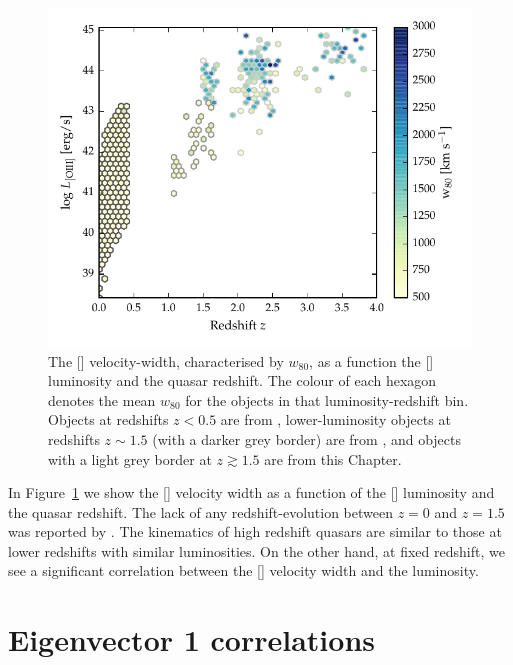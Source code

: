 \begin{figure}[t!]
    \includegraphics[width=\columnwidth]{figures/chapter04/oiii_luminosity_z_w80.pdf} 
    \caption[{The [] velocity-width, characterised by $w_{80}$, as a function the [] luminosity and the quasar redshift.}]{The [] velocity-width, characterised by $w_{80}$, as a function the [] luminosity and the quasar redshift. The colour of each hexagon denotes the mean $w_{80}$ for the objects in that luminosity-redshift bin. Objects at redshifts $z<0.5$ are from \citet{mullaney13}, lower-luminosity objects at redshifts $z\sim1.5$ (with a darker grey border) are from \citet{harrison16}, and objects with a light grey border at $z \gtrsim 1.5$ are from this Chapter.}       
    \label{fig:oiii_luminosity_z_w80}
\end{figure}

In Figure~\ref{fig:oiii_luminosity_z_w80} we show the [] velocity width as a function of the [] luminosity and the quasar redshift. 
The lack of any redshift-evolution between $z=0$ and $z=1.5$ was reported by \citet{harrison16}.
The kinematics of high redshift quasars are similar to those at lower redshifts with similar luminosities. 
On the other hand, at fixed redshift, we see a significant correlation between the [] velocity width and the luminosity. 

\section{Eigenvector 1 correlations}

